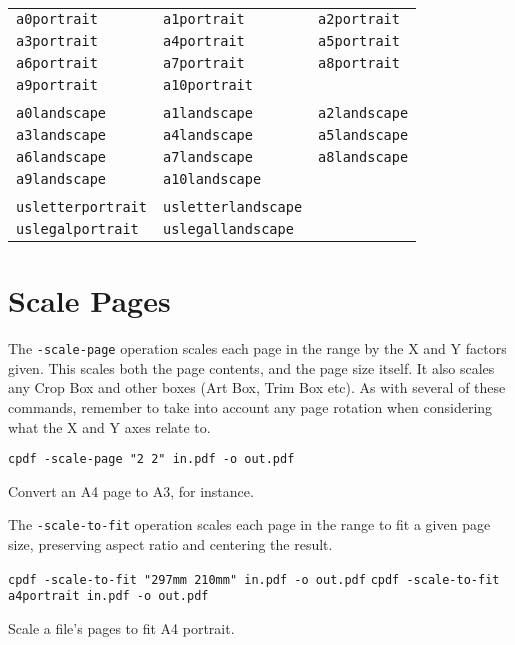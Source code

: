 \documentclass{book}
\newcommand{\smallgap}{\bigskip}
\begin{document}
{\small
  \smallgap
  \begin{tabular}{lll}
  \texttt{a0portrait} & \texttt{a1portrait} & \texttt{a2portrait} \\
  \texttt{a3portrait} & \texttt{a4portrait} & \texttt{a5portrait} \\
  \texttt{a6portrait} & \texttt{a7portrait} & \texttt{a8portrait} \\
  \texttt{a9portrait} & \texttt{a10portrait} & \\
  \\
  \texttt{a0landscape} & \texttt{a1landscape} & \texttt{a2landscape} \\
  \texttt{a3landscape} & \texttt{a4landscape} & \texttt{a5landscape} \\
  \texttt{a6landscape} & \texttt{a7landscape} & \texttt{a8landscape} \\
  \texttt{a9landscape} & \texttt{a10landscape} & \\
  \\
  \texttt{usletterportrait} & \texttt{usletterlandscape} & \\
  \texttt{uslegalportrait} & \texttt{uslegallandscape} &
  \end{tabular}
}
  \section{Scale Pages}
  The \texttt{-scale-page} operation scales each page in the range by the X and
Y factors given. This scales both the page contents, and the page size itself. It also scales any Crop Box and other boxes (Art Box, Trim Box etc). As with several of these commands, remember to take into account any page rotation when considering what the X and Y axes relate to.

  \begin{framed}
  \small\noindent\verb!cpdf -scale-page "2 2" in.pdf -o out.pdf!

  \vspace{2.5mm}
  \noindent Convert an A4 page to A3, for instance.
  \end{framed}

  \noindent The \texttt{-scale-to-fit} operation scales each page in the range to fit a
  given page size, preserving aspect ratio and centering the result.

  \begin{framed}
  \small\noindent\verb!cpdf -scale-to-fit "297mm 210mm" in.pdf -o out.pdf!
  \small\noindent\verb!cpdf -scale-to-fit a4portrait in.pdf -o out.pdf!

  \vspace{2.5mm}
  \noindent Scale a file's pages to fit A4 portrait.
  \end{framed}
\end{document}
